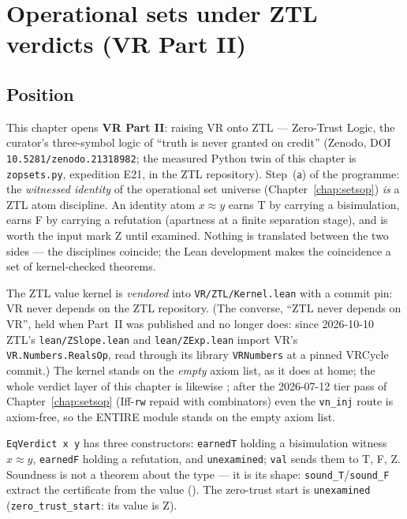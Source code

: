 \chapter{Operational sets under ZTL verdicts (VR Part II)}
\label{chap:setsztl}

\section{Position}
\label{sec:setsztl_position}

This chapter opens \textbf{VR Part II}: raising VR onto ZTL --- Zero-Trust
Logic, the curator's three-symbol logic of ``truth is never granted on
credit'' (Zenodo, DOI \texttt{10.5281/zenodo.21318982}; the measured Python
twin of this chapter is \texttt{zopsets.py}, expedition E21, in the ZTL
repository).  Step~(а) of the programme: the \emph{witnessed identity} of the
operational set universe (Chapter~\ref{chap:setsop}) \emph{is} a ZTL atom
discipline.  An identity atom $x \approx y$ earns \textsf{T} by carrying a
bisimulation, earns \textsf{F} by carrying a refutation (apartness at a finite
separation stage), and is worth the input mark \textsf{Z} until examined.
Nothing is translated between the two sides --- the disciplines coincide;
the Lean development makes the coincidence a set of kernel-checked theorems.

The ZTL value kernel is \emph{vendored} into
\texttt{VR/ZTL/Kernel.lean} with a commit pin: VR never depends on the ZTL
repository.  (The converse, ``ZTL never depends on VR'', held when Part~II
was published and no longer does: since 2026-10-10 ZTL's
\texttt{lean/ZSlope.lean} and \texttt{lean/ZExp.lean} import VR's
\texttt{VR.Numbers.RealsOp}, read through its library \texttt{VRNumbers}
at a pinned VRCycle commit.)  The kernel stands on the \emph{empty}
axiom list, as it does at home; the whole verdict layer of this chapter is
likewise \axiomprofile{[]}; after the 2026-07-12 tier pass of
Chapter~\ref{chap:setsop} (Iff-\texttt{rw} repaid with combinators) even the
\texttt{vn\_inj} route is axiom-free, so the ENTIRE module stands on the
empty axiom list.

\begin{definition}
\label{def:setsztl_eqverdict}
\leanok
{}
\texttt{EqVerdict x y} has three constructors: \texttt{earnedT} holding a
bisimulation witness $x \approx y$, \texttt{earnedF} holding a refutation,
and \texttt{unexamined}; \texttt{val} sends them to \textsf{T}, \textsf{F},
\textsf{Z}.  Soundness is not a theorem about the type --- it is its shape:
\texttt{sound\_T}/\texttt{sound\_F} extract the certificate from the value
(\axiomprofile{[]}).  The zero-trust start is \texttt{unexamined}
(\texttt{zero\_trust\_start}: its value is \textsf{Z}).
\end{definition}

